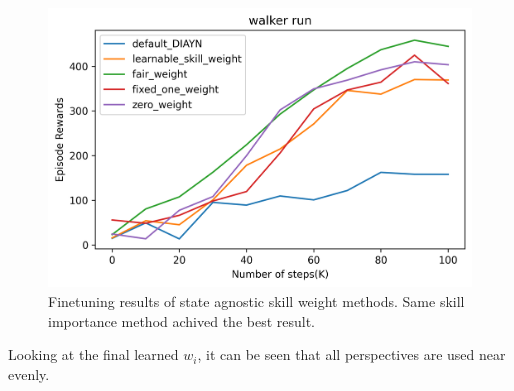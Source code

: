 

  \begin{figure}[ht]
    \vskip 0.2in
    \begin{center}
    \centerline{\includegraphics[width=\columnwidth]{Figures/Comparison_state_agnostic_skill_weight_methods.png}}
    \caption{Finetuning results of state agnostic skill weight methods. Same skill importance method achived the best result.}
    \label{state agnostic results}
    \end{center}
    \vskip -0.2in
    \end{figure}
Looking at the final learned ${w_i}$, it can be seen that all perspectives are used near evenly.


